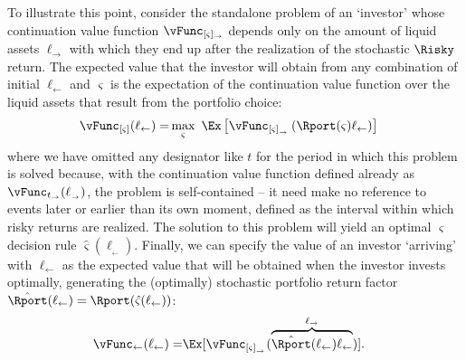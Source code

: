 To illustrate this point, consider the standalone problem of an `investor' whose continuation value function $\vFunc_{[\varsigma]_\rightarrow}$ depends only on the amount of liquid assets $\ell_{\rightarrow}$ with which they end up after the realization of the stochastic $\Risky$ return.  The expected value that the investor will obtain from any combination of initial $\ell_{\leftarrow}$ and $\varsigma$ is the expectation of the continuation value function over the liquid assets that result from the portfolio choice:
\begin{equation}\begin{gathered}\begin{aligned}
      \vFunc_{[\varsigma]}({\ell_{\leftarrow}})
      = & \max_{\varsigma}~ \Ex\left[        \vFunc_{[\varsigma]_{_\rightarrow}}\left(\Rport(\varsigma){\ell_{\leftarrow}}        \right)
      \right] \label{eq:vMidStgShr}
    \end{aligned}\end{gathered}\end{equation}
where we have omitted any designator like $t$ for the period in which this problem is solved because, with the continuation value function defined already as $\vFunc_{t_\rightarrow}({\ell}_{_\rightarrow})$, the problem is self-contained -- it need make no reference to events later or earlier than its own moment, defined as the interval within which risky returns are realized.  The solution to this problem will yield an optimal $\varsigma$ decision rule $\hat{\varsigma}(\ell_{_\leftarrow}).$  Finally, we can specify the value of an investor `arriving' with $\ell_{\leftarrow}$ as the expected value that will be obtained when the investor invests optimally, generating the (optimally) stochastic portfolio return factor $\hat{\Rport}(\ell_{\leftarrow})=\Rport(\hat{\varsigma}(\ell_{\leftarrow}))$:
\begin{equation}\begin{gathered}\begin{aligned}
      \vFunc_{\leftarrow}({\ell_{\leftarrow}})  = & \Ex[\vFunc_{[\varsigma]_{_\rightarrow}}(\overbrace{
        \hat{\Rport}(\ell_{\leftarrow}){\ell_{\leftarrow}}}^{\ell_{\rightarrow}})].
    \end{aligned}\end{gathered}\end{equation}

